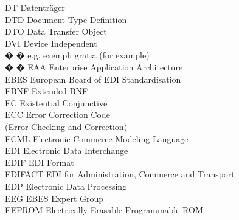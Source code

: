 \begin{tabbing}
    \>DT \>\>Datentr\"{a}ger\\

    \>DTD \>\>Document Type Definition\\


    \>DTO \>\>Data Transfer Object\\

    \>DVI \>\>Device Independent\\


� � \>e.g. \>\>exempli gratia (for example)\\

� � \>EAA \>\>Enterprise Application Architecture\\


    \>EBES \>\>European Board of EDI Standardisation\\

    \>EBNF \>\>Extended BNF\\

    \>EC \>\>Existential Conjunctive\\

    \>ECC \>\>Error Correction Code\\
        \>\>\>(Error Checking and Correction)\\

    \>ECML \>\>Electronic Commerce Modeling Language\\


    \>EDI \>\>Electronic Data Interchange\\

    \>EDIF \>\>EDI Format\\

    \>EDIFACT \>\>EDI for Administration, Commerce and Transport\\

    \>EDP \>\>Electronic Data Processing\\

    \>EEG \>\>EBES Expert Group\\

    \>EEPROM \>\>Electrically Erasable Programmable ROM\\


\end{tabbing}
